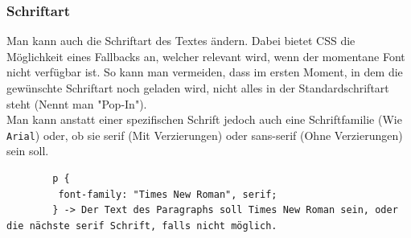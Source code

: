 \documentclass{article}
\begin{document}
\begin{itemize}
		\subsubsection{Schriftart}
		Man kann auch die Schriftart des Textes ändern. Dabei bietet CSS die Möglichkeit eines Fallbacks an, welcher relevant wird, wenn der momentane Font nicht verfügbar ist. So kann man vermeiden, dass im ersten Moment, in dem die gewünschte Schriftart noch geladen wird, nicht alles in der Standardschriftart steht (Nennt man "Pop-In"). \\
		Man kann anstatt einer spezifischen Schrift jedoch auch eine Schriftfamilie (Wie \texttt{Arial}) oder, ob sie serif (Mit Verzierungen) oder sans-serif (Ohne Verzierungen) sein soll.
		\begin{verbatim}
		p {
		 font-family: "Times New Roman", serif;
		} -> Der Text des Paragraphs soll Times New Roman sein, oder die nächste serif Schrift, falls nicht möglich.
		\end{verbatim}

\end{itemize}
\end{document}
